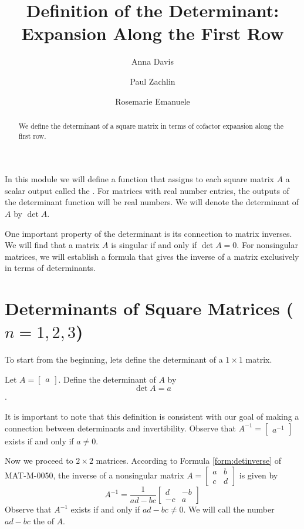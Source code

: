 \documentclass{ximera}
\author{Anna Davis \and Paul Zachlin \and Rosemarie Emanuele} \title{Definition of the Determinant: Expansion Along the First Row} \license{CC-BY 4.0}
\begin{document}
\begin{abstract}
 We define the determinant of a square matrix in terms of cofactor expansion along the first row.
\end{abstract}
\maketitle

In this module we will define a function that assigns to each square matrix $A$ a scalar output called the .  For matrices with real number entries, the outputs of the determinant function will be real numbers.  We will denote the determinant of $A$ by $\det{A}$.  

One important property of the determinant is its connection to matrix inverses.  We will find that a matrix $A$ is singular if and only if $\det{A}=0$.  For nonsingular matrices, we will establish a formula that gives the inverse of a matrix exclusively in terms of determinants.

\section*{Determinants of Square Matrices ($n=1,2,3$)}
To start from the beginning, lets define the determinant of a $1\times 1$ matrix.
\begin{definition}\label{def:onebyonedet} Let
$A=\begin{bmatrix}a\end{bmatrix}$.  Define the determinant of $A$ by $$\det{A}=a$$.  
\end{definition}
It is important to note that this definition is consistent with our goal of making a connection between determinants and invertibility.  Observe that $A^{-1}=\begin{bmatrix}a^{-1}\end{bmatrix}$ exists if and only if $a\neq 0$.

Now we proceed to $2\times 2$ matrices.  According to Formula \ref{form:detinverse} of {\color{red} MAT-M-0050}, the inverse of a nonsingular matrix $A=\begin{bmatrix}a&b\\c&d\end{bmatrix}$ is given by
$$A^{-1}=\frac{1}{ad-bc}\begin{bmatrix}d&-b\\-c&a\end{bmatrix}$$
Observe that $A^{-1}$ exists if and only if $ad-bc\neq 0$.  We will call the number $ad-bc$ the  of $A$.
\end{document}
